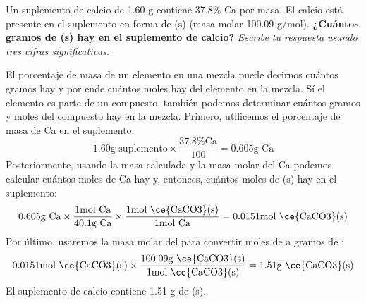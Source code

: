 Un suplemento de calcio de 1.60 g contiene 37.8\% Ca por masa. El calcio está presente en el suplemento en forma de (s) (masa molar 100.09 g/mol).
\textbf{¿Cuántos gramos de (s) hay en el suplemento de calcio?}
\emph{Escribe tu respuesta usando tres cifras significativas.}


\begin{solutionbox}{8cm}
    El porcentaje de masa de un elemento en una mezcla puede decirnos cuántos gramos hay y por ende cuántos moles hay del elemento en la mezcla. Sí el elemento es parte de un compuesto, también podemos determinar cuántos gramos y moles del compuesto hay en la mezcla.
    Primero, utilicemos el porcentaje de masa de Ca en el suplemento:
    \[1.60 \text{g suplemento} \times \frac{37.8\text{\% Ca}}{100} = 0.605\text{g Ca}\]
    Posteriormente, usando la masa calculada y la masa molar del Ca podemos calcular cuántos moles de Ca hay y, entonces, cuántos moles de (s) hay en el suplemento:
    \[0.605\text{g Ca} \times \frac{1\text{mol Ca}}{40.1\text{g Ca}} \times \frac{1\text{mol \ce{CaCO3}(s)}}{1\text{mol Ca}} = 0.0151\text{mol \ce{CaCO3}(s)}\]
    Por último, usaremos la masa molar del  para convertir moles de  a gramos de :
    \[0.0151\text{mol \ce{CaCO3}(s)} \times \frac{100.09\text{g \ce{CaCO3}(s)}}{1\text{mol \ce{CaCO3}(s)}} = 1.51\text{g \ce{CaCO3}(s)}\]
    El suplemento de calcio contiene 1.51 g de (s).
\end{solutionbox}